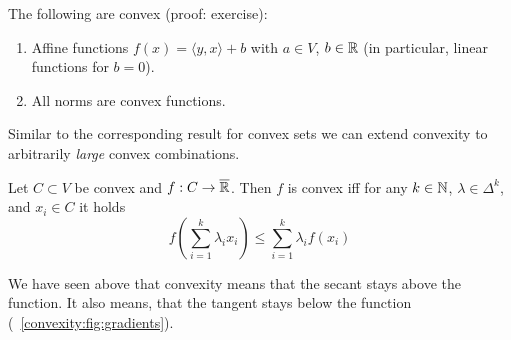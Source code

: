 \begin{example}
    The following are convex (proof: exercise):
    \begin{enumerate}
        \item Affine functions $f(x)=\langle y, x\rangle + b$ with $a\in V$, $b\in \mathbb{R}$ (in particular, linear functions for $b=0$).
        \item All norms are convex functions.
    \end{enumerate}
\end{example}

Similar to the corresponding result for convex sets we can extend convexity to arbitrarily \emph{large} convex combinations.

\begin{theorem}[Jensen]
    Let $C\subset V$ be convex and $f:C\rightarrow \overline{\mathbb{R}}$. Then $f$ is convex iff for any $k\in \mathbb{N}$, $\lambda\in \Delta^k$, and $x_i\in C$ it holds
    \begin{equation}
        f(\sum_{i=1}^k\lambda_i x_i)\leq \sum_{i=1}^k\lambda_i f(x_i)
    \end{equation}
\end{theorem}

We have seen above that convexity means that the secant stays above the function. It also means, that the tangent stays below the function (\cf~\cref{convexity:fig:gradients}). 

